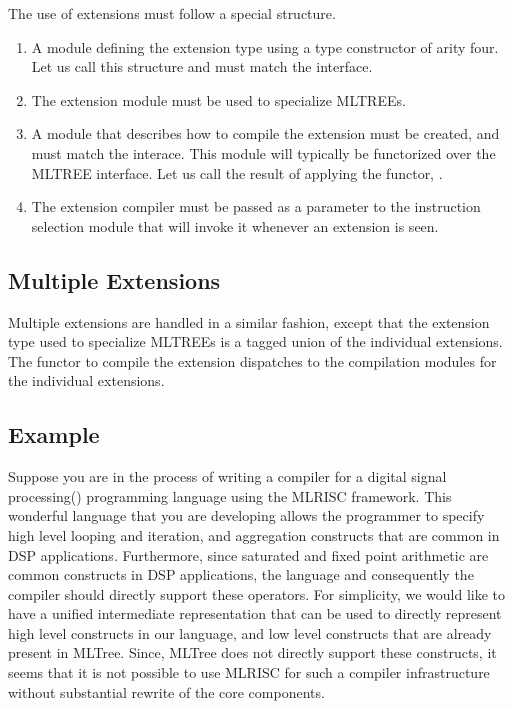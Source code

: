 The use of extensions must follow a special structure. 
\begin{enumerate}
 \item A module defining the extension type using a type constructor
of arity four. Let us call this structure  and must match
the  interface.
 \item The extension module must be used to specialize MLTREEs. 
 \item A module that describes how to compile the extension must be
created, and must match the  interace.
This module will typically be functorized over the MLTREE interface.
Let us call the result of applying the functor, .
 \item The extension compiler must be passed as a parameter to the
instruction selection module that will invoke it whenever an extension 
is seen.
\end{enumerate}


\subsection{Multiple Extensions}

Multiple extensions are handled in a similar fashion, except that the
extension type used to specialize MLTREEs is a tagged union of the
individual extensions. The functor to compile the extension dispatches 
to the compilation modules for the individual extensions.

\subsection{Example}
Suppose you are in the process of writing a compiler for a digital
signal processing() programming language using the MLRISC
framework.  This wonderful language that you are developing allows the
programmer to specify high level looping and iteration, and
aggregation constructs that are common in DSP applications.
Furthermore, since saturated and fixed point arithmetic are common
constructs in DSP applications, the language and consequently the
compiler should directly support these operators.  For simplicity, we
would like to have a unified intermediate representation that can be
used to directly represent high level constructs in our language, and
low level constructs that are already present in MLTree.  Since,
MLTree does not directly support these constructs, it seems that it is
not possible to use MLRISC for such a compiler infrastructure without
substantial rewrite of the core components.

